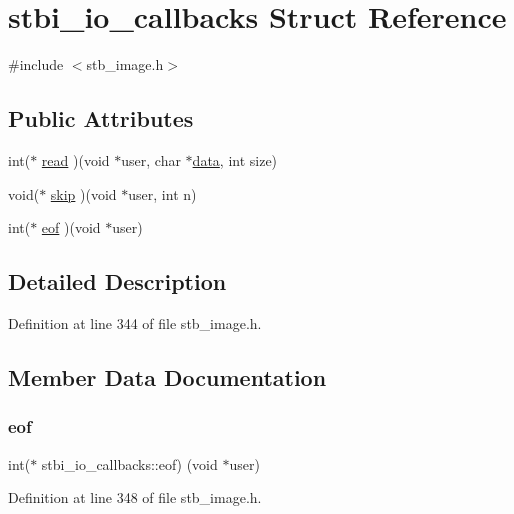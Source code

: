 \hypertarget{structstbi__io__callbacks}{}\section{stbi\+\_\+io\+\_\+callbacks Struct Reference}
\label{structstbi__io__callbacks}


{\ttfamily \#include $<$stb\+\_\+image.\+h$>$}

\subsection*{Public Attributes}
\begin{DoxyCompactItemize}
\item 
int($\ast$ \mbox{\hyperlink{structstbi__io__callbacks_a623e46b3a2a019611601409926283a88}{read}} )(void $\ast$user, char $\ast$\mbox{\hyperlink{structdata}{data}}, int size)
\item 
void($\ast$ \mbox{\hyperlink{structstbi__io__callbacks_a257aac5480a90a6c4b8fbe86c1b01068}{skip}} )(void $\ast$user, int n)
\item 
int($\ast$ \mbox{\hyperlink{structstbi__io__callbacks_a319639db2f76e715eed7a7a974136832}{eof}} )(void $\ast$user)
\end{DoxyCompactItemize}


\subsection{Detailed Description}


Definition at line 344 of file stb\+\_\+image.\+h.



\subsection{Member Data Documentation}
\mbox{\label{structstbi__io__callbacks_a319639db2f76e715eed7a7a974136832}} 
\subsubsection{\texorpdfstring{eof}{eof}}
{\footnotesize\ttfamily int($\ast$ stbi\+\_\+io\+\_\+callbacks\+::eof) (void $\ast$user)}



Definition at line 348 of file stb\+\_\+image.\+h.

